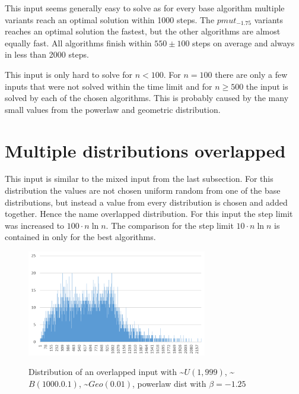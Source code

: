 

This input seems generally easy to solve as for every base algorithm multiple variants reach an optimal solution within 1000 steps.
The $pmut_{-1.75}$ variants reaches an optimal solution the fastest, but the other algorithms are almost equally fast.
All algorithms finish within $550 \pm 100$ steps on average and always in less than 2000 steps.



This input is only hard to solve for $n<100$.
For $n = 100$ there are only a few inputs that were not solved within the time limit and for $n\ge500$ the input is solved by each of the chosen algorithms.
This is probably caused by the many small values from the powerlaw and geometric distribution.


% 


\section{Multiple distributions overlapped}
This input is similar to the mixed input from the last subsection.
For this distribution the values are not chosen uniform random from one of the base distributions, but instead a value from every distribution is chosen and added together.
Hence the name overlapped distribution.
For this input the step limit was increased to $100\cdot n \ln n$.
The comparison for the step limit $10\cdot n \ln n$ is contained in only for the best algorithms.

\begin{figure}[h]
      \caption{Distribution of an overlapped input with \textasciitilde$U(1,999)$, \textasciitilde$B(1000.0.1)$, \textasciitilde$Geo(0.01)$, powerlaw dist with $\beta=-1.25$}
      \centering
      \includegraphics[width=0.7\textwidth]{figures/images/numberGenerator/overlapped.png}\label{fig:overlappedDistExample}
\end{figure}

